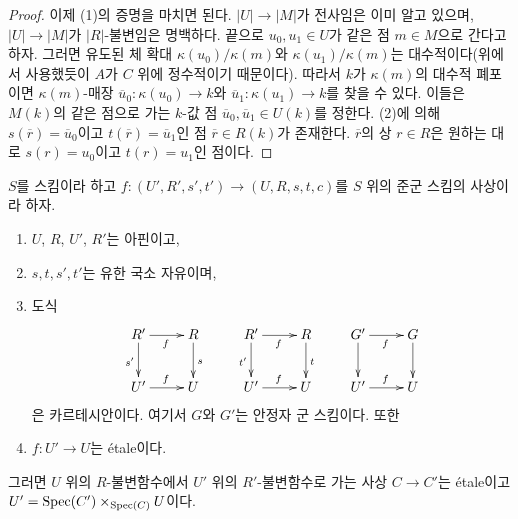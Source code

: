 \begin{proof}
\medskip\noindent
이제 (1)의 증명을 마치면 된다. $|U| \to |M|$가 전사임은 이미 알고 있으며, $|U| \to |M|$가 $|R|$-불변임은 명백하다.
끝으로 $u_0, u_1 \in U$가 같은 점 $m \in M$으로 간다고 하자. 그러면 유도된 체 확대
$\kappa(u_0)/\kappa(m)$와 $\kappa(u_1)/\kappa(m)$는 대수적이다(위에서 사용했듯이 $A$가 $C$ 위에 정수적이기 때문이다).
따라서 $k$가 $\kappa(m)$의 대수적 폐포이면 $\kappa(m)$-매장
$\overline{u}_0 : \kappa(u_0) \to k$와 $\overline{u}_1 : \kappa(u_1) \to k$를 찾을 수 있다.
이들은 $M(k)$의 같은 점으로 가는 $k$-값 점 $\overline{u}_0, \overline{u}_1 \in U(k)$를 정한다.
(2)에 의해 $s(\overline{r}) = \overline{u}_0$이고 $t(\overline{r}) = \overline{u}_1$인 점
$\overline{r} \in R(k)$가 존재한다. $\overline{r}$의 상 $r \in R$은 원하는 대로
$s(r) = u_0$이고 $t(r) = u_1$인 점이다.
\end{proof}

\begin{lemma}
\label{lemma-etale}
$S$를 스킴이라 하고 $f : (U', R', s', t') \to (U, R, s, t, c)$를 $S$ 위의 준군 스킴의 사상이라 하자.
\begin{enumerate}
\item $U$, $R$, $U'$, $R'$는 아핀이고,
\item $s, t, s', t'$는 유한 국소 자유이며,
\item 도식
$$
\xymatrix{
R' \ar[d]_{s'} \ar[r]_f & R \ar[d]^s \\
U' \ar[r]^f & U
}
\quad
\quad
\xymatrix{
R' \ar[d]_{t'} \ar[r]_f & R \ar[d]^t \\
U' \ar[r]^f & U
}
\quad
\quad
\xymatrix{
G' \ar[d] \ar[r]_f & G \ar[d] \\
U' \ar[r]^f & U
}
$$
은 카르테시안이다. 여기서 $G$와 $G'$는 안정자 군 스킴이다. 또한
\item $f : U' \to U$는 \'etale이다.
\end{enumerate}
그러면 $U$ 위의 $R$-불변함수에서 $U'$ 위의 $R'$-불변함수로 가는 사상 $C \to C'$는 \'etale이고
$U' = \mathop{\mathrm{Spec}}(C') \times_{\mathop{\mathrm{Spec}}(C)} U$이다.
\end{lemma}

